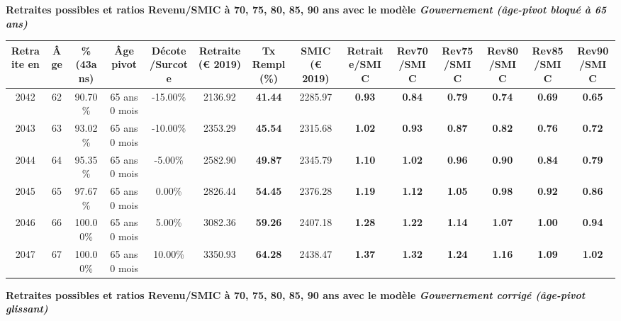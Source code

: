 {\bf \noindent Retraites possibles et ratios Revenu/SMIC à 70, 75, 80, 85, 90 ans avec le modèle \emph{Gouvernement (âge-pivot bloqué à 65 ans)}}  
 
\begin{adjustbox}{max width=\textwidth} 
\begin{tabular}[htb]{|c|c||c|c|c||c|c||c||c|c|c|c|c|c|} 
\hline 
 Retraite en &  Âge &  \%(43ans) &  Âge pivot &  Décote/Surcote &  Retraite (\euro{} 2019) &  Tx Rempl(\%) &  SMIC (\euro{} 2019) &  Retraite/SMIC &  Rev70/SMIC &  Rev75/SMIC &  Rev80/SMIC &  Rev85/SMIC &  Rev90/SMIC \\ 
\hline \hline 
 2042 &  62 &  90.70\% &  65 ans 0 mois &  -15.00\% &  2136.92 &  {\bf 41.44} &  2285.97 &  {\bf {\color{red} 0.93}} &  {\bf {\color{red} 0.84}} &  {\bf {\color{red} 0.79}} &  {\bf {\color{red} 0.74}} &  {\bf {\color{red} 0.69}} &  {\bf {\color{red} 0.65}} \\ 
\hline 
 2043 &  63 &  93.02\% &  65 ans 0 mois &  -10.00\% &  2353.29 &  {\bf 45.54} &  2315.68 &  {\bf 1.02} &  {\bf {\color{red} 0.93}} &  {\bf {\color{red} 0.87}} &  {\bf {\color{red} 0.82}} &  {\bf {\color{red} 0.76}} &  {\bf {\color{red} 0.72}} \\ 
\hline 
 2044 &  64 &  95.35\% &  65 ans 0 mois &  -5.00\% &  2582.90 &  {\bf 49.87} &  2345.79 &  {\bf 1.10} &  {\bf 1.02} &  {\bf {\color{red} 0.96}} &  {\bf {\color{red} 0.90}} &  {\bf {\color{red} 0.84}} &  {\bf {\color{red} 0.79}} \\ 
\hline 
 2045 &  65 &  97.67\% &  65 ans 0 mois &  0.00\% &  2826.44 &  {\bf 54.45} &  2376.28 &  {\bf 1.19} &  {\bf 1.12} &  {\bf 1.05} &  {\bf {\color{red} 0.98}} &  {\bf {\color{red} 0.92}} &  {\bf {\color{red} 0.86}} \\ 
\hline 
 2046 &  66 &  100.00\% &  65 ans 0 mois &  5.00\% &  3082.36 &  {\bf 59.26} &  2407.18 &  {\bf 1.28} &  {\bf 1.22} &  {\bf 1.14} &  {\bf 1.07} &  {\bf 1.00} &  {\bf {\color{red} 0.94}} \\ 
\hline 
 2047 &  67 &  100.00\% &  65 ans 0 mois &  10.00\% &  3350.93 &  {\bf 64.28} &  2438.47 &  {\bf 1.37} &  {\bf 1.32} &  {\bf 1.24} &  {\bf 1.16} &  {\bf 1.09} &  {\bf 1.02} \\ 
\hline 
\hline 
\end{tabular} 
\end{adjustbox} 
 
 \vspace{0.1cm} 
{\bf \noindent Retraites possibles et ratios Revenu/SMIC à 70, 75, 80, 85, 90 ans avec le modèle \emph{Gouvernement corrigé (âge-pivot glissant)}}  
 

